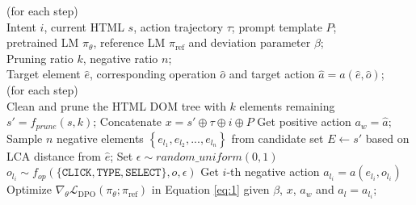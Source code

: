 \documentclass{article}
\begin{document}
  
  \begin{algorithm}
      \caption{WEPO Algorithm} 
      \label{alg:Framework} 
      \begin{algorithmic}[1]
      \REQUIRE (for each step) ~~\\
      Intent $i$, current HTML $s$, action trajectory $\tau$; prompt template $P$;\\
      pretrained LM $\pi_{\theta}$, reference LM $\pi_{\mathrm{ref}}$ and deviation parameter $\beta$;\\
      Pruning ratio $k$, negative ratio $n$;\\
      Target element $\hat{e}$, corresponding operation $\hat{o}$ and target action $\hat{a} = a(\hat{e}, \hat{o})$;\\
      \ENSURE (for each step) ~~\\
      \STATE Clean and prune the HTML DOM tree with $k$ elements remaining ${s}' = f_{prune}(s, k)$;
      \label{ code:fram:prune }
      \STATE Concatenate $x = {s}' \oplus \tau \oplus i \oplus P$
      \STATE Get positive action $a_w = \hat{a}$;
      \STATE Sample $n$ negative elements $\left \{ e_{l_1}, e_{l_2}, ..., e_{l_n} \right \} $ from candidate set $E \leftarrow {s}'$ based on LCA distance from $\hat{e}$;
      \label{ code:fram:sample }
      \STATE Set $\epsilon \sim random\_uniform(0,1)$
      \STATE $o_{l_i} \sim f_{op}(\{\texttt{CLICK}, \texttt{TYPE}, \texttt{SELECT}\}, \hat{o}, \epsilon)$
      \STATE Get $i$-th negative action $a_{l_i} = a(e_{l_i}, o_{l_i})$
      \STATE Optimize $\nabla_{\theta} \mathcal{L}_{\mathrm{DPO}}\left(\pi_{\theta}; \pi_{\mathrm{ref}}\right)$ in Equation \ref{eq:1} given $\beta$, $x$, $a_w$ and $a_l = a_{l_i}$;
      \ENDFOR
      \end{algorithmic}
  \end{algorithm}
      
\end{document}
